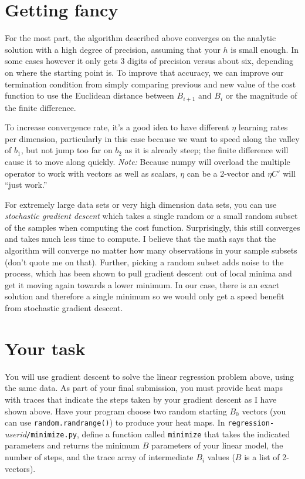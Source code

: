 \documentclass[titlepage]{tufte-book}
\newcounter{problem}
\begin{document}
\begin{fullwidth}
\section{Getting fancy}

For the most part, the algorithm described above converges on the analytic solution with a high degree of precision, assuming that your $h$ is small enough. In some cases however it only gets 3 digits of precision versus about six, depending on where the starting point is. To improve that accuracy, we can improve our termination condition from simply comparing previous and new value of the cost function to use the Euclidean distance between $B_{i+1}$ and $B_i$ or the magnitude of the finite difference. 

To increase convergence rate, it's a good idea to have different $\eta$ learning rates per dimension, particularly in this case because we want to speed along the valley of $b_1$, but not jump too far on $b_2$ as it is already steep; the finite difference will cause it to move along quickly. {\em Note:} Because numpy will overload the {\tt *} multiple operator to work with vectors as well as scalars, $\eta$ can be a 2-vector and $\eta C'$ will ``just work.''

For extremely large data sets or very high dimension data sets, you can use {\em stochastic gradient descent} which takes a single random or a small random subset of the samples when computing the cost function. Surprisingly, this still converges and takes much less time to compute. I believe that the math says that the algorithm will converge no matter how many observations in your sample subsets (don't quote me on that). Further, picking a random subset adds noise to the process, which has been shown to pull gradient descent out of local minima and get it moving again towards a lower minimum. In our case, there is an exact solution and therefore a single minimum so we would only get a speed benefit from stochastic gradient descent.

\section{Your task}

You will use gradient descent to solve the linear regression problem above, using the same data. As part of your final submission, you must provide heat maps with traces that indicate the steps taken by your gradient descent as I have shown above.  Have your program choose two random starting $B_0$ vectors (you can use {\tt random.randrange()}) to produce your heat maps.   In {\tt regression-}{\em userid}{\tt /minimize.py}, define a function called {\tt minimize} that takes the indicated parameters and returns the minimum $B$ parameters of your linear model, the number of steps, and the trace array of intermediate $B_i$ values ($B$ is a list of 2-vectors).


\end{fullwidth}
\end{document}
